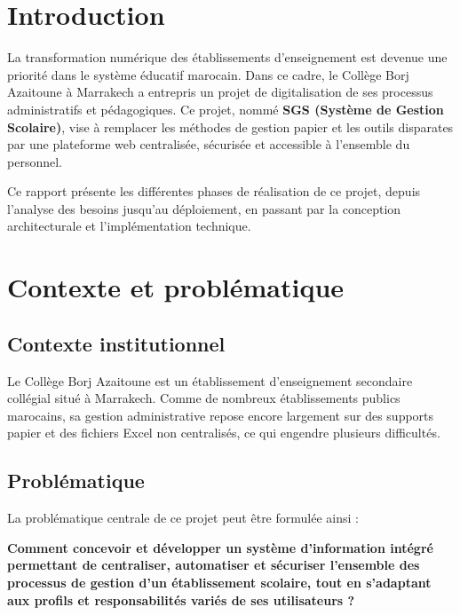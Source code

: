 \documentclass[12pt,a4paper]{report}
\begin{document}
\chapter{Introduction}

La transformation numérique des établissements d'enseignement est devenue une priorité dans le système éducatif marocain. Dans ce cadre, le Collège Borj Azaitoune à Marrakech a entrepris un projet de digitalisation de ses processus administratifs et pédagogiques. Ce projet, nommé \textbf{SGS (Système de Gestion Scolaire)}, vise à remplacer les méthodes de gestion papier et les outils disparates par une plateforme web centralisée, sécurisée et accessible à l'ensemble du personnel.

Ce rapport présente les différentes phases de réalisation de ce projet, depuis l'analyse des besoins jusqu'au déploiement, en passant par la conception architecturale et l'implémentation technique.

\chapter{Contexte et problématique}

\section{Contexte institutionnel}

Le Collège Borj Azaitoune est un établissement d'enseignement secondaire collégial situé à Marrakech. Comme de nombreux établissements publics marocains, sa gestion administrative repose encore largement sur des supports papier et des fichiers Excel non centralisés, ce qui engendre plusieurs difficultés.

\section{Problématique}

La problématique centrale de ce projet peut être formulée ainsi :

\begin{infobox}
\noindent\textbf{Comment concevoir et développer un système d'information intégré permettant de centraliser, automatiser et sécuriser l'ensemble des processus de gestion d'un établissement scolaire, tout en s'adaptant aux profils et responsabilités variés de ses utilisateurs ?}
\end{infobox}
\end{document}
